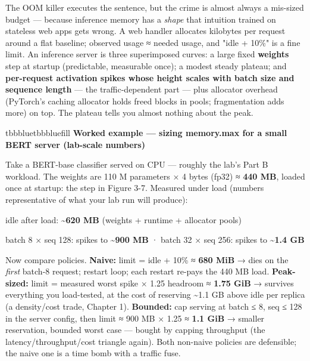 The OOM killer executes the sentence, but the crime is almost always a mis-sized budget — because inference memory has a \textit{shape} that intuition trained on stateless web apps gets wrong. A web handler allocates kilobytes per request around a flat baseline; observed usage ≈ needed usage, and "idle + 10\%" is a fine limit. An inference server is three superimposed curves: a large fixed \textbf{weights} step at startup (predictable, measurable once); a modest steady plateau; and \textbf{per-request activation spikes whose height scales with batch size and sequence length} — the traffic-dependent part — plus allocator overhead (PyTorch's caching allocator holds freed blocks in pools; fragmentation adds more) on top. The plateau tells you almost nothing about the peak.

\begin{calloutbox}{tbbblue}{tbbbluefill}
{\normalsize\bfseries\color{tbbblue}Worked example — sizing memory.max for a small BERT server (lab-scale numbers)}\par\vspace{3pt}
Take a BERT-base classifier served on CPU — roughly the lab's Part B workload. The weights are 110 M parameters × 4 bytes (fp32) ≈ \textbf{440 MB}, loaded once at startup: the step in Figure 3-7. Measured under load (numbers representative of what your lab run will produce):

\begin{tbbitemize}
  \item idle after load: \textbf{\textasciitilde{}620 MB} (weights + runtime + allocator pools)
  \item batch 8 × seq 128: spikes to \textbf{\textasciitilde{}900 MB}  ·  batch 32 × seq 256: spikes to \textbf{\textasciitilde{}1.4 GB}
\end{tbbitemize}

Now compare policies. \textbf{Naive:} limit = idle + 10\% ≈ \textbf{680 MiB} → dies on the \textit{first} batch-8 request; restart loop; each restart re-pays the 440 MB load. \textbf{Peak-sized:} limit = measured worst spike × 1.25 headroom ≈ \textbf{1.75 GiB} → survives everything you load-tested, at the cost of reserving \textasciitilde{}1.1 GB above idle per replica (a density/cost trade, Chapter 1). \textbf{Bounded:} cap serving at batch ≤ 8, seq ≤ 128 in the server config, then limit ≈ 900 MB × 1.25 ≈ \textbf{1.1 GiB} → smaller reservation, bounded worst case — bought by capping throughput (the latency/throughput/cost triangle again). Both non-naive policies are defensible; the naive one is a time bomb with a traffic fuse.
\end{calloutbox}

